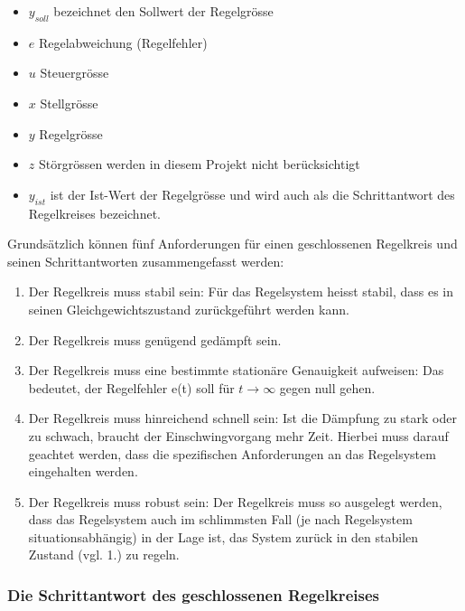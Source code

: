 \begin{itemize}
    \item
        $y_{soll}$ bezeichnet den Sollwert der Regelgr\"osse
    \item
        $e$ Regelabweichung (Regelfehler)
    \item
        $u$ Steuergr\"osse
    \item
        $x$ Stellgr\"osse
    \item
        $y$ Regelgr\"osse
    \item
        $z$ St\"orgr\"ossen werden in diesem Projekt nicht ber\"ucksichtigt
    \item
        $y_{ist}$ ist  der Ist-Wert  der Regelgr\"osse und  wird auch  als die
        Schrittantwort des Regelkreises bezeichnet.
\end{itemize}


Grunds\"atzlich  k\"onnen  f\"unf   Anforderungen  f\"ur  einen  geschlossenen
Regelkreis und seinen Schrittantworten zusammengefasst werden:
\begin{enumerate}
    \item
        Der Regelkreis muss stabil  sein: F\"ur das Regelsystem heisst stabil,
        dass es in seinen Gleichgewichtszustand zur\"uckgef\"uhrt werden kann.
    \item
        Der Regelkreis muss gen\"ugend ged\"ampft sein.
    \item
        Der   Regelkreis   muss   eine  bestimmte   station\"are   Genauigkeit
        aufweisen: Das   bedeutet,    der   Regelfehler   e(t)    soll   f\"ur
        $t\rightarrow\infty$ gegen null gehen.
    \item
        Der  Regelkreis  muss  hinreichend schnell  sein: Ist  die  D\"ampfung
        zu  stark   oder  zu  schwach,  braucht   der  Einschwingvorgang  mehr
        Zeit. Hierbei  muss  darauf  geachtet werden,  dass  die  spezifischen
        Anforderungen an das Regelsystem eingehalten werden.
    \item
        Der  Regelkreis muss  robust  sein: Der Regelkreis  muss so  ausgelegt
        werden,  dass  das  Regelsystem  auch im  schlimmsten  Fall  (je  nach
        Regelsystem situationsabh\"angig) in der Lage ist, das System zur\"uck
        in den stabilen Zustand (vgl. 1.) zu regeln.
\end{enumerate}


\subsubsection*{Die Schrittantwort des geschlossenen Regelkreises}


